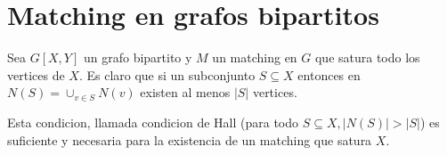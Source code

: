 \documentclass[APUNTE_COMPLEMENTOS.tex]{subfiles}
\begin{document}
\section{Matching en grafos bipartitos}

Sea $G[X,Y]$ un grafo bipartito y $M$ un matching en $G$ que satura todo los vertices de $X$. Es claro que si un subconjunto $S \subseteq X$ entonces en $N(S) = \cup_{v \in S} N(v)$ existen al menos $|S|$ vertices.

Esta condicion, llamada condicion de Hall (para todo $S \subseteq X, |N(S)|>|S|$) es suficiente y necesaria para la existencia de un matching que satura $X$.

\end{document}
